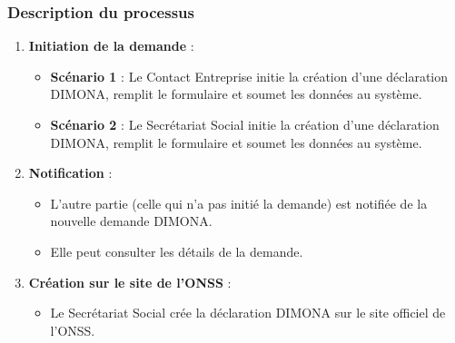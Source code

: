 \subsubsection{Description du processus}

\begin{enumerate}
  \item \textbf{Initiation de la demande} :
    \begin{itemize}
      \item \textbf{Scénario 1} : Le Contact Entreprise initie la création d'une déclaration DIMONA, remplit le formulaire et soumet les données au système.
      \item \textbf{Scénario 2} : Le Secrétariat Social initie la création d'une déclaration DIMONA, remplit le formulaire et soumet les données au système.
    \end{itemize}

  \item \textbf{Notification} :
    \begin{itemize}
      \item L'autre partie (celle qui n'a pas initié la demande) est notifiée de la nouvelle demande DIMONA.
      \item Elle peut consulter les détails de la demande.
    \end{itemize}

  \item \textbf{Création sur le site de l'ONSS} :
    \begin{itemize}
      \item Le Secrétariat Social crée la déclaration DIMONA sur le site officiel de l'ONSS.
    \end{itemize}


\end{enumerate}
